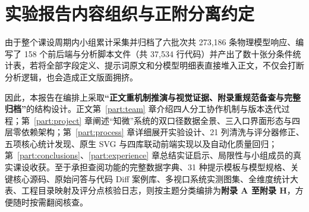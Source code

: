 
\section{实验报告内容组织与正附分离约定}

由于整个课设周期内小组累计采集并归档了六批次共 273,186 条物理模型响应、编写了 158 个前后端与分析脚本文件（共 37,534 行代码）并产出了数十张分条件统计表，若将全部字段定义、提示词原文和分模型明细表直接堆入正文，不仅会打断分析逻辑，也会造成正文版面拥挤。

因此，本报告在编排上采取\textbf{“正文重机制推演与视觉证据、附录重规范备查与完整归档”}的结构设计。正文第~\ref{part:team} 章介绍四人分工协作机制与版本迭代过程；第~\ref{part:project} 章阐述“知微”系统的双口径数据全景、三入口界面形态与四层零依赖架构；第~\ref{part:process} 章详细展开实验设计、21 列清洗与评分器修正、五项核心统计发现、原生 SVG 与四库联动前端实现以及自动化质量回归；第~\ref{part:conclusions}、\ref{part:experience} 章总结实证启示、局限性与小组成员的真实课设收获。至于承担查阅功能的完整数据字典、31 种提示模板与模型规格、关键核心源码、原始问答与代码 Diff 案例库、多视口系统实测图集、全维度统计大表、工程目录映射及评分点核验日志，则按主题分类编排为\textbf{附录 A 至附录 H}，方便随时按需翻阅核查。
